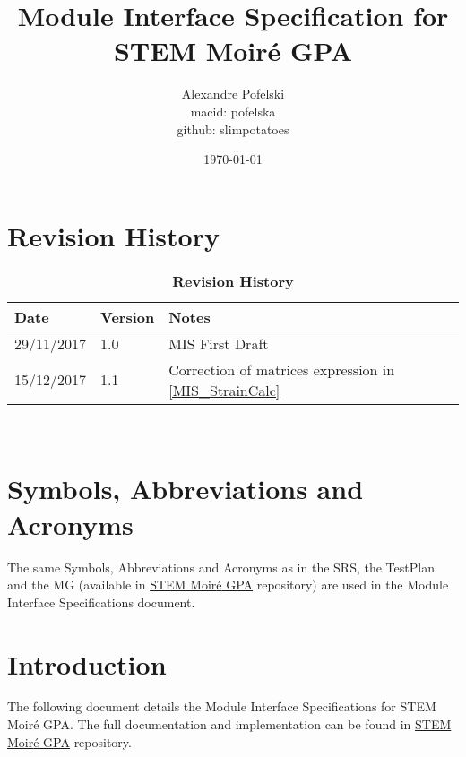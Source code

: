 \documentclass[12pt, titlepage]{article}
\newcommand{\progname}{STEM Moir{\'e} GPA}
\begin{document}
\title{Module Interface Specification for \progname{}}

\author{Alexandre Pofelski \\
		macid: pofelska \\
		github: slimpotatoes}

\date{\today}

\maketitle


\section{Revision History}

\begin{table}[h]
\caption{\bf Revision History}
\begin{tabularx}{\textwidth}{p{3cm}p{2cm}X}
\toprule {\bf Date} & {\bf Version} & {\bf Notes}\\
\midrule
29/11/2017 & 1.0 & MIS First Draft\\
15/12/2017 & 1.1 & Correction of matrices expression in 
\cref{MIS_StrainCalc}\\
\bottomrule
\end{tabularx}
\end{table}

~\newpage

\section{Symbols, Abbreviations and Acronyms}

The same Symbols, Abbreviations and Acronyms as in the SRS, the TestPlan and the 
MG (available in 
\href{https://github.com/slimpotatoes/STEM_Moire_GPA}{\progname{}} repository) 
are used in the Module Interface Specifications document. 

\newpage

\tableofcontents

\newpage


\section{Introduction}

The following document details the Module Interface Specifications for 
\progname{}. The full documentation and implementation can be found in 
\href{https://github.com/slimpotatoes/STEM_Moire_GPA}{\progname{}} repository.
\end{document}
